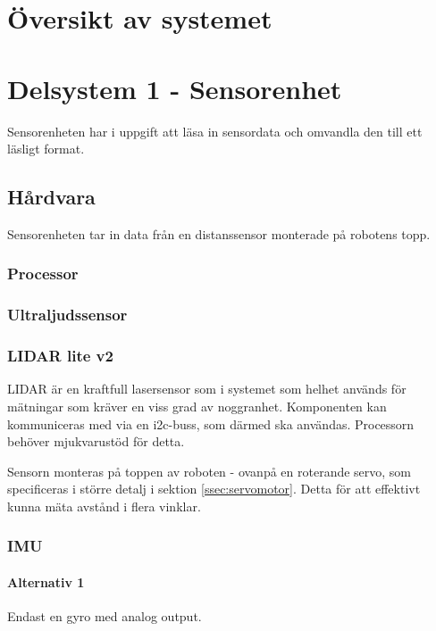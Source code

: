 \documentclass[a4paper,11pt]{article}
\begin{document}
\section{Översikt av systemet}


\section{Delsystem 1 - Sensorenhet}

Sensorenheten har i uppgift att läsa in sensordata och omvandla den till ett läsligt format.


\subsection{Hårdvara}

Sensorenheten tar in data från en distanssensor monterade på robotens topp.
\subsubsection{Processor} %
\subsubsection{Ultraljudssensor}


\subsubsection{LIDAR lite v2}
LIDAR är en kraftfull lasersensor som i systemet som helhet används för mätningar som kräver en viss grad av noggranhet. Komponenten kan kommuniceras med via en i2c-buss, som därmed ska användas. Processorn behöver mjukvarustöd för detta.

Sensorn monteras på toppen av roboten - ovanpå en roterande servo, som specificeras i större detalj i sektion \ref{ssec:servomotor}. Detta för att effektivt kunna mäta avstånd i flera vinklar.

\subsubsection{IMU}

\paragraph{Alternativ 1}
Endast en gyro med analog output.
\end{document}
